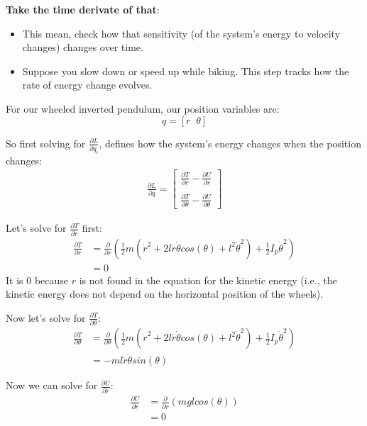 \textbf{Take the time derivate of that}:
	\begin{itemize}
		\item This mean, check how that sensitivity (of the system's energy to velocity changes) changes over time.
		\item Suppose you slow down or speed up while biking. This step tracks how the rate of energy change evolves.
	\end{itemize}

For our wheeled inverted pendulum, our position variables are:
\begin{equation}
	q = [r \;\; \theta]
\end{equation}

So first solving for $\frac{\partial L}{\partial q_i}$, defines how the system's energy changes when the position changes:
\begin{align}
	\frac{\partial L}{\partial q} = \begin{bmatrix}\frac{\partial T}{\partial r} - \frac{\partial U}{\partial r} \\ \\ \frac{\partial T}{\partial \theta} - \frac{\partial U}{\partial \theta}\end{bmatrix}
\end{align}

Let's solve for $\frac{\partial T}{\partial r}$ first:
\begin{align}
	\frac{\partial T}{\partial r} &= \frac{\partial}{\partial r} (\frac{1}{2}m(\dot{r}^2 + 2l\dot{r}\dot{\theta}cos(\theta) + l^2\dot{\theta}^2) + \frac{1}{2}I_p\dot{\theta}^2) \\
	&= 0
\end{align}
It is 0 because $r$ is not found in the equation for the kinetic energy (i.e., the kinetic energy does not depend on the horizontal position of the wheels).

Now let's solve for $\frac{\partial T}{\partial \theta}$:
\begin{align}
	\frac{\partial T}{\partial \theta} &=  \frac{\partial}{\partial \theta} (\frac{1}{2}m(\dot{r}^2 + 2l\dot{r}\dot{\theta}cos(\theta) + l^2\dot{\theta}^2) + \frac{1}{2}I_p\dot{\theta}^2) \\
	&= -ml\dot{r}\dot{\theta}sin(\theta)
\end{align}

Now we can solve for $\frac{\partial U}{\partial r}$:
\begin{align}
	\frac{\partial U}{\partial r} &= \frac{\partial}{\partial r} (mglcos(\theta)) \\
	&= 0
\end{align}

